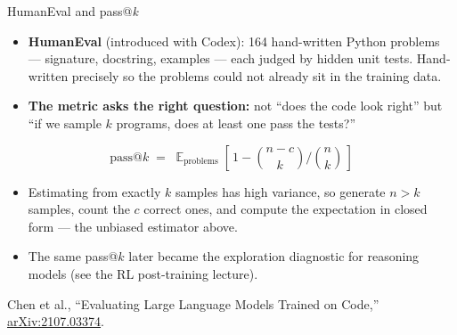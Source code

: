 \begin{frame}{HumanEval and pass@\emph{k}}
  \begin{itemize}\itemsep0.3em
    \item[\textcolor{red}{$\triangleright$}] \textbf{HumanEval} (introduced with Codex): 164 hand-written
      Python problems --- signature, docstring, examples --- each judged by hidden unit tests. Hand-written
      precisely so the problems could not already sit in the training data.
    \item[\textcolor{red}{$\triangleright$}] \textbf{The metric asks the right question:} not ``does the
      code look right'' but ``if we sample $k$ programs, does at least one pass the tests?''
  \end{itemize}
  \[
    \text{pass@}k \;=\; \mathop{\mathbb{E}}_{\text{problems}}\!\left[\, 1 - \binom{n-c}{k}\Big/\binom{n}{k} \,\right]
  \]
  \begin{itemize}\itemsep0.3em
    \item[\textcolor{red}{$\triangleright$}] Estimating from exactly $k$ samples has high variance, so
      generate $n > k$ samples, count the $c$ correct ones, and compute the expectation in closed form ---
      the unbiased estimator above.
    \item[\textcolor{red}{$\triangleright$}] The same pass@$k$ later became the exploration diagnostic for
      reasoning models (see the RL post-training lecture).
  \end{itemize}
  \vspace{0.2em}
  {\scriptsize Chen et al., ``Evaluating Large Language Models Trained on Code,''
  \href{https://arxiv.org/abs/2107.03374}{arXiv:2107.03374}.}
\end{frame}

